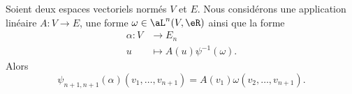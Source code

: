 \begin{lemma}
	Soient deux espaces vectoriels normés \( V\) et \( E\). Nous considérons une application linéaire \( A\colon V\to E\), une forme \( \omega\in\aL^n(V,\eR)\) ainsi que la forme
	\begin{equation}
		\begin{aligned}
			\alpha\colon V & \to E_n                        \\
			u              & \mapsto A(u)\psi^{-1}(\omega).
		\end{aligned}
	\end{equation}
	Alors
	\begin{equation}
		\psi_{n+1,n+1}(\alpha)(v_1,\ldots, v_{n+1})=A(v_1)\omega(v_2,\ldots, v_{n+1}).
	\end{equation}
\end{lemma}

